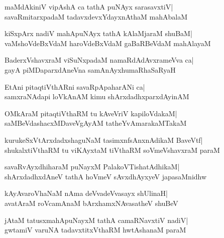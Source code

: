\documentclass[twoside,12pt,openright]{book}
\newcounter{shloka}[chapter]
\begin{document}
\begin{shloka}%
maMdAkiniV vipAshA ca tathA puNAyx sarasavxtiV|\\
savaRmitarxpadaM tadavxdevxYdayxnAthaM mahAbalaM
\end{shloka}

\begin{shloka}%
kiSxpArx nadiV mahApuNAyx tathA kAlaMjaraM shuBaM|\\
vaMshoVdeBxVdaM haroVdeBxVdaM gaBaRBeVdaM mahAlayaM
\end{shloka}

\begin{shloka}%
BaderxVshavxraM viSuNxpadaM namaRdAdAvxrameVva ca|\\
gayA piMDaparxdAneVna samAnAyxhumaRhaSaRyaH
\end{shloka}

\begin{shloka}%
EtAni pitaqtiVthARni savaRpApaharANi ca|\\
samxraNAdapi loVkAnAM kimu shArxdadhxparxdAyinAM
\end{shloka}

\begin{shloka}%
OMkAraM pitaqtiVthaRM tu kAveVriV kapiloVdakaM|\\
saMBeVdashacxMDaveVgAyAM tatheYvAmarakaMTakaM
\end{shloka}

\begin{shloka}%
kurukeSxVtArxdadxshaguNaM tasimxnfsAnxnAdikaM BaveVtf|\\
shukalxtiVthaRM tu viKAyxtaM tiVthaRM soVmeVshavxraM paraM
\end{shloka}

\begin{shloka}%
savaRvAyxdhiharaM puNayxM PalakoVTishatAdhikaM|\\
shArxdadhxdAneV tathA hoVmeV sAvxdhAyxyeV japasaMnidhw
\end{shloka}

\begin{shloka}%
kAyAvaroVhaNaM nAma deVvadeVvasayx shUlinaH|\\
avatAraM roVcamAnaM bArxhamxNAvasatheV shuBeV
\end{shloka}

\begin{shloka}%
jAtaM tatusxmahApuNayxM tathA camaRNavxtiV nadiV|\\
gwtamiV varuNA tadavxtitxVthaRM hwtAshanaM paraM
\end{shloka}
\end{document}
